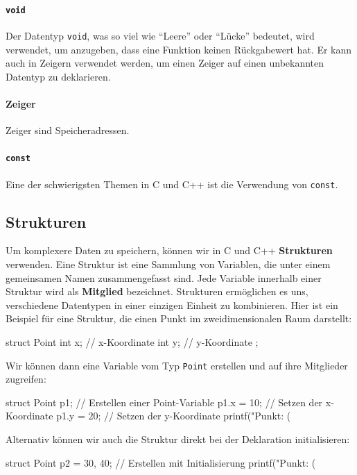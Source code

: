\paragraph{\texttt{void}}
Der Datentyp \texttt{void}, was so viel wie ``Leere'' oder ``Lücke'' bedeutet, wird verwendet, um anzugeben, dass eine Funktion keinen Rückgabewert hat. Er kann auch in Zeigern verwendet werden, um einen Zeiger auf einen unbekannten Datentyp zu deklarieren.

\paragraph{Zeiger}
Zeiger sind Speicheradressen. 

\paragraph{\texttt{const}}
Eine der schwierigsten Themen in C und C++ ist die Verwendung von \texttt{const}. 

\subsection{Strukturen}
\label{sec:referenz:c:struct}

Um komplexere Daten zu speichern, können wir in C und C++ \textbf{Strukturen} verwenden. Eine Struktur ist eine Sammlung von Variablen, die unter einem gemeinsamen Namen zusammengefasst sind. Jede Variable innerhalb einer Struktur wird als \textbf{Mitglied} bezeichnet. Strukturen ermöglichen es uns, verschiedene Datentypen in einer einzigen Einheit zu kombinieren.
Hier ist ein Beispiel für eine Struktur, die einen Punkt im zweidimensionalen Raum darstellt:
\begin{code}
struct Point {
    int x; // x-Koordinate
    int y; // y-Koordinate
};
\end{code}
Wir können dann eine Variable vom Typ \texttt{Point} erstellen und auf ihre Mitglieder zugreifen:
\begin{code}
struct Point p1; // Erstellen einer Point-Variable
p1.x = 10; // Setzen der x-Koordinate
p1.y = 20; // Setzen der y-Koordinate
printf("Punkt: (%
\end{code}
Alternativ können wir auch die Struktur direkt bei der Deklaration initialisieren:
\begin{code}
struct Point p2 = {30, 40}; // Erstellen mit Initialisierung
printf("Punkt: (%
\end{code}

